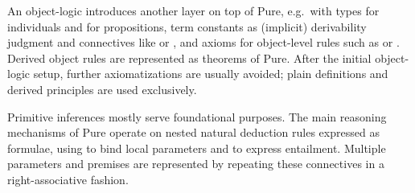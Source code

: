 \begin{isabellebody}
\begin{isamarkuptext}
  \medskip An object-logic introduces another layer on top of Pure,
  e.g.\ with types  for individuals and  for
  propositions, term constants  as
  (implicit) derivability judgment and connectives like  or , and axioms for object-level
  rules such as  or .  Derived object rules are represented as theorems of
  Pure.  After the initial object-logic setup, further axiomatizations
  are usually avoided; plain definitions and derived principles are
  used exclusively.%
\end{isamarkuptext}%
\isamarkuptrue%
%
\isamarkuptrue%
%
\begin{isamarkuptext}%
Primitive inferences mostly serve foundational purposes.  The main
  reasoning mechanisms of Pure operate on nested natural deduction
  rules expressed as formulae, using \isa{{\isachardoublequote}{\isasymAnd}{\isachardoublequote}} to bind local
  parameters and \isa{{\isachardoublequote}{\isasymLongrightarrow}{\isachardoublequote}} to express entailment.  Multiple
  parameters and premises are represented by repeating these
  connectives in a right-associative fashion.


\end{isamarkuptext}
\end{isabellebody}
